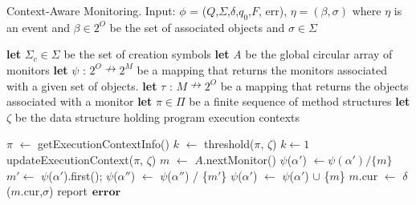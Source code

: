 \begin{algorithm}[t]
\caption[Algorithm]{Context-Aware Monitoring. Input: $\phi$ = 
($Q$,$\Sigma$,$\delta$,$q_{0}$,$F$, err), $\eta=(\beta, \sigma)$ where $\eta$ is an event and $\beta \in 2^O$ 
be the set of associated objects and $\sigma \in \Sigma$}          %
\label{alg1}                           %
\begin{algorithmic}[1]                  
   \STATE \textbf{let} $\Sigma_{c} \in \Sigma$ be the set of creation symbols
   \STATE \textbf{let} \textit{A} be the global circular array of monitors
    \STATE \textbf{let} $\psi$ : $2^O \nrightarrow 2^M$ be a mapping that returns the monitors associated with a given set of objects.
   \STATE \textbf{let} $\tau$ : $M \nrightarrow 2^O$ be a mapping that returns the objects associated with a monitor
   \STATE \textbf{let} $\pi \in \Pi$ be a finite sequence of method structures
   \STATE \textbf{let} $\zeta$ be the data structure holding program execution contexts
  
   
        \STATE $\pi$  $\leftarrow$ getExecutionContextInfo()
           \STATE $k$ $\leftarrow$ threshold($\pi$, $\zeta$)
        \ELSE
        	   \STATE $k \leftarrow 1$
        \ENDIF
        \STATE updateExecutionContext($\pi$, $\zeta$)
            	\STATE $m$ $\leftarrow$ $A$.nextMonitor()
		\STATE $\psi$($\alpha'$) $\leftarrow  \psi(\alpha') / \{m\}$
        		\ENDFOR
				 \STATE $m' \leftarrow$ $\psi$($\alpha'$).first();
					\STATE $\psi$($\alpha''$) $\leftarrow$  
$\psi$($\alpha''$) / \{$m'$\}
        				\ENDFOR
			\ENDIF
                		 \STATE $\psi$($\alpha'$) $\leftarrow$  
$\psi$($\alpha'$) $\cup$ \{$m$\}
        		\ENDFOR
        \ENDIF
 \ENDIF
     \STATE $m$.cur $\leftarrow$ $\delta$($m$.cur,$\sigma$)
        \STATE report$\hspace{5pt}\textbf{error}$
     \ENDIF
 \ENDFOR
 
\end{algorithmic}

\end{algorithm}
\label{algo:monitoring}



